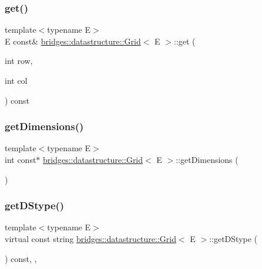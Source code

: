 \subsubsection{\texorpdfstring{get()}{get()}}
{\footnotesize\ttfamily template$<$typename E$>$ \\
E const\& \hyperlink{classbridges_1_1datastructure_1_1_grid}{bridges\+::datastructure\+::\+Grid}$<$ E $>$\+::get (\begin{DoxyParamCaption}\item[{int}]{row,  }\item[{int}]{col }\end{DoxyParamCaption}) const\hspace{0.3cm}{\ttfamily [inline]}}

\mbox{\label{classbridges_1_1datastructure_1_1_grid_a5f1427f96782b3667585c06caef0b533}} 
\subsubsection{\texorpdfstring{get\+Dimensions()}{getDimensions()}}
{\footnotesize\ttfamily template$<$typename E$>$ \\
int const$\ast$ \hyperlink{classbridges_1_1datastructure_1_1_grid}{bridges\+::datastructure\+::\+Grid}$<$ E $>$\+::get\+Dimensions (\begin{DoxyParamCaption}{ }\end{DoxyParamCaption})\hspace{0.3cm}{\ttfamily [inline]}}

\mbox{\label{classbridges_1_1datastructure_1_1_grid_a16aeae38446b96f440dea15f2b19334d}} 
\subsubsection{\texorpdfstring{get\+D\+Stype()}{getDStype()}}
{\footnotesize\ttfamily template$<$typename E$>$ \\
virtual const string \hyperlink{classbridges_1_1datastructure_1_1_grid}{bridges\+::datastructure\+::\+Grid}$<$ E $>$\+::get\+D\+Stype (\begin{DoxyParamCaption}{ }\end{DoxyParamCaption}) const\hspace{0.3cm}{\ttfamily [inline]}, {\ttfamily [override]}, {\ttfamily [virtual]}}

